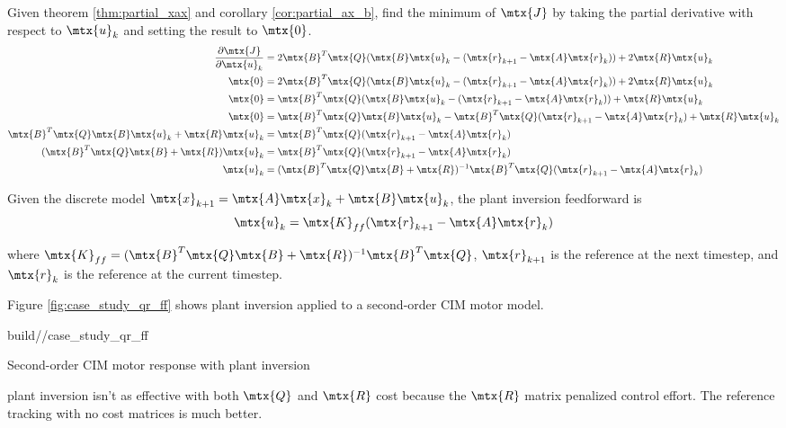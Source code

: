 Given theorem \ref{thm:partial_xax} and corollary \ref{cor:partial_ax_b}, find
the minimum of $\mtx{J}$ by taking the partial derivative with respect to
$\mtx{u}_k$ and setting the result to $\mtx{0}$.
\begin{align*}
  \frac{\partial\mtx{J}}{\partial\mtx{u}_k} &= 2\mtx{B}^T\mtx{Q}
    (\mtx{B}\mtx{u}_k - (\mtx{r}_{k+1} - \mtx{A}\mtx{r}_k)) +
    2\mtx{R}\mtx{u}_k \\
  \mtx{0} &= 2\mtx{B}^T\mtx{Q}
    (\mtx{B}\mtx{u}_k - (\mtx{r}_{k+1} - \mtx{A}\mtx{r}_k)) +
    2\mtx{R}\mtx{u}_k \\
  \mtx{0} &= \mtx{B}^T\mtx{Q}
    (\mtx{B}\mtx{u}_k - (\mtx{r}_{k+1} - \mtx{A}\mtx{r}_k)) +
    \mtx{R}\mtx{u}_k \\
  \mtx{0} &= \mtx{B}^T\mtx{Q}\mtx{B}\mtx{u}_k -
    \mtx{B}^T\mtx{Q}(\mtx{r}_{k+1} - \mtx{A}\mtx{r}_k) + \mtx{R}\mtx{u}_k \\
  \mtx{B}^T\mtx{Q}\mtx{B}\mtx{u}_k + \mtx{R}\mtx{u}_k &=
    \mtx{B}^T\mtx{Q}(\mtx{r}_{k+1} - \mtx{A}\mtx{r}_k) \\
  (\mtx{B}^T\mtx{Q}\mtx{B} + \mtx{R})\mtx{u}_k &=
    \mtx{B}^T\mtx{Q}(\mtx{r}_{k+1} - \mtx{A}\mtx{r}_k) \\
  \mtx{u}_k &= (\mtx{B}^T\mtx{Q}\mtx{B} + \mtx{R})^{-1}
    \mtx{B}^T\mtx{Q}(\mtx{r}_{k+1} - \mtx{A}\mtx{r}_k)
\end{align*}
\begin{theorem}
  Given the discrete model
  $\mtx{x}_{k+1} = \mtx{A}\mtx{x}_k + \mtx{B}\mtx{u}_k$, the plant inversion
  feedforward is
  \begin{equation*}
    \mtx{u}_k = \mtx{K}_{ff} (\mtx{r}_{k+1} - \mtx{A}\mtx{r}_k)
  \end{equation*}

  where
  $\mtx{K}_{ff} = (\mtx{B}^T\mtx{Q}\mtx{B} + \mtx{R})^{-1}\mtx{B}^T\mtx{Q}$,
  $\mtx{r}_{k+1}$ is the reference at the next timestep, and $\mtx{r}_k$ is the
  reference at the current timestep.
\end{theorem}

Figure \ref{fig:case_study_qr_ff} shows \gls{plant} inversion applied to a
second-order CIM motor model.
\begin{svg}{build/\partpath/case_study_qr_ff}
  \caption{Second-order CIM motor response with plant inversion}
  \label{fig:case_study_qr_ff}
\end{svg}

\Gls{plant} inversion isn't as effective with both $\mtx{Q}$ and $\mtx{R}$ cost
because the $\mtx{R}$ matrix penalized \gls{control effort}. The \gls{reference}
\gls{tracking} with no cost matrices is much better.
